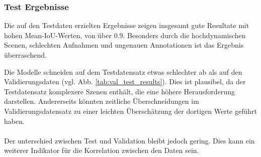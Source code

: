\documentclass[12pt,DIV=15,BCOR=15mm,twoside,headsepline,abstract=true,listof=totoc,bibliography=totoc]{scrreprt}
\theoremstyle{remark}    %
\begin{document}
    \subsubsection{Test Ergebnisse}
    Die auf den Testdaten erzielten Ergebnisse zeigen insgesamt gute Resultate mit hohen Mean-\ac{IoU}-Werten, von über 0.9.
    Besonders durch die hochdynamischen Scenen, schlechten Aufnahmen und ungenauen Annotationen ist das Ergebnis überraschend.
    \begin{table}[hb]
        \centering
        \caption{Validierungs- und Testmetriken der einzelnen Folds}
        \label{tab:val_test_results}
        \setlength{\tabcolsep}{5pt} 
        \renewcommand{\arraystretch}{1.3}
    \end{table}\noindent
    Die Modelle schneiden auf dem Testdatensatz etwas schlechter ab als auf den Validierungsdaten (vgl. Abb.  \ref{tab:val_test_results}). 
    Dies ist plausibel, da der Testdatensatz komplexere Szenen enthält, die eine höhere Herausforderung darstellen. Andererseits könnten 
    zeitliche Überschneidungen im Validierungsdatensatz zu einer leichten Überschätzung der dortigen Werte geführt haben.\\\\ 
    Der unterschied zwischen Test und Validation bleibt jedoch gering. Dies kann ein weiterer Indikator für die Korrelation zwischen den Daten sein.
\end{document}

